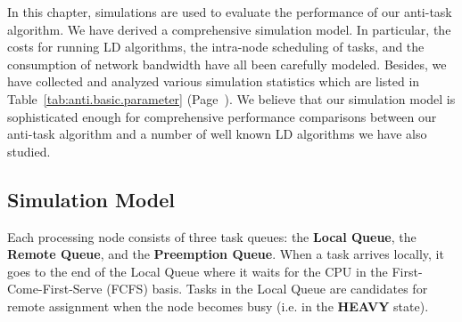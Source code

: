 

In this chapter, simulations are used to evaluate the performance of our
anti-task algorithm.
We have derived a comprehensive simulation model.
In particular, the costs for running LD algorithms, 
the intra-node scheduling of tasks, and the consumption of network bandwidth
have all been carefully modeled. 
Besides, we have collected and analyzed various simulation statistics
which are listed in Table~\ref{tab:anti.basic.parameter} 
(Page~\pageref{tab:anti.basic.parameter}).
We believe that our simulation model is sophisticated enough for 
comprehensive performance comparisons between our anti-task algorithm and
a number of well known LD algorithms we have also studied.




\subsection {Simulation Model}
\label {sec:anti.basic.node_model}

Each processing node consists of three task queues:
the {\bf Local Queue}, the {\bf Remote Queue}, and the {\bf Preemption Queue}.
When a task arrives locally, it goes to the end of the Local Queue
where it waits for the CPU in the First-Come-First-Serve (FCFS) basis.
Tasks in the Local Queue are candidates for remote assignment when
the node becomes busy (i.e. in the {\bf HEAVY} state).


